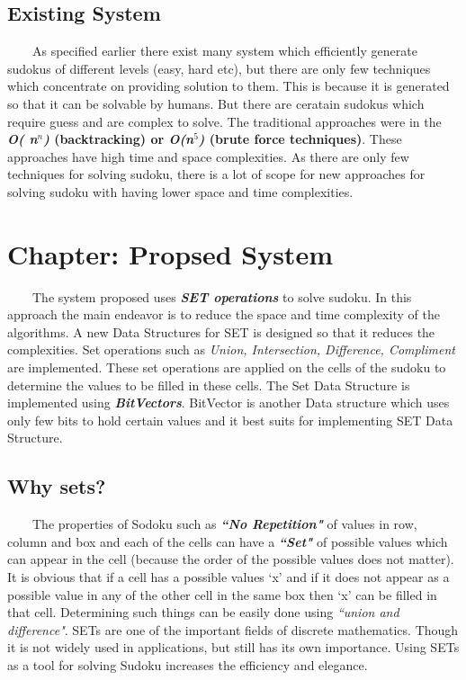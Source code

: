 \documentclass[12pt,a4paper]{article}
\begin{document}
\subsection{Existing System}
\ \ \ \ As specified earlier there exist many system which efficiently generate sudokus of different levels (easy, hard etc), but there are only few techniques which concentrate on providing solution to them. This is because it is generated so that it can be solvable by humans. But there are ceratain sudokus which require guess and are complex to solve. The traditional approaches were in the \textbf{\textit{O( n$^n$)} (backtracking) or \textit{O(n$^5$)} (brute force techniques)}. These approaches have high time and space complexities. As there are only few techniques for solving sudoku, there is a lot of scope for new approaches for solving sudoku with having lower space and time complexities. 

\newpage
\section{Chapter: Propsed System}
\ \ \ \ The system proposed uses \textit{\textbf{SET operations}} to solve sudoku. In this approach the main endeavor is to reduce the space and time complexity of the algorithms. A new Data Structures for SET is designed so that it reduces the complexities. Set operations such as \textit{Union, Intersection, Difference, Compliment} are implemented. These set operations are applied on the cells of the sudoku to determine the values to be filled in these cells. The Set Data Structure is implemented using \textbf{\textit{BitVectors}}. BitVector is another Data structure which uses only few bits to hold certain values and it best suits for implementing SET Data Structure. 

\subsection{Why sets?}
\ \ \ \ The properties of Sodoku such as \textit{\textbf{``No Repetition"}} of values in row, column and box and each of the cells can have a \textit{\textbf{``Set"}} of possible values which can appear in the cell (because the order of the possible values does not matter). It is obvious that if a cell has a possible values `x' and if it does not appear as a possible value in any of the other cell in the same box then `x' can be filled in that cell. Determining such things can be easily done using \textit{``union and difference"}. SETs are one of the important fields of discrete mathematics. Though it is not widely used in applications, but still has its own importance. Using SETs as a tool for solving Sudoku increases the efficiency and elegance. 
\end{document}
